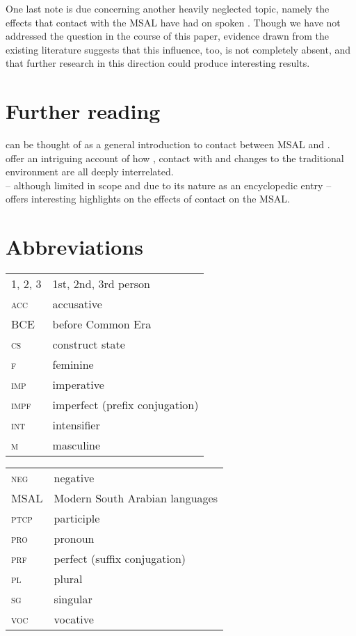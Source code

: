 \documentclass[output=paper]{langsci/langscibook}
\begin{document}
One last note is due concerning another heavily neglected topic, namely the effects that contact with the MSAL have had on spoken . Though we have not addressed the question in the course of this paper, evidence drawn from the existing literature \citep{Simeone-Senelle2002} suggests that this influence, too, is not completely absent, and that further research in this direction could produce interesting results. 

\section*{Further reading}

 \citet{Morris2017} can be thought of as a general introduction to contact between MSAL and . \\
 \citet{WatsonAl-Mahri2017} offer an intriguing account of how , contact with  and changes to the traditional environment are all deeply interrelated. \\ \citet{Lonnet2011} – although limited in scope and  due to its nature as an encyclopedic entry – offers interesting highlights on the effects of contact on the MSAL.

\section*{Abbreviations}

\begin{tabularx}{.45\textwidth}[t]{@{}lQ@{}}
\textsc{1, 2, 3} & 1st, 2nd, 3rd person \\
\textsc{acc} & accusative \\
BCE & before Common Era \\
\textsc{cs} & construct state \\
\textsc{f} & feminine \\
\textsc{imp} & imperative \\
\textsc{impf} & imperfect (prefix conjugation) \\
\textsc{int} & intensifier \\
\textsc{m} & masculine \\
\end{tabularx}%
\begin{tabularx}{.5\textwidth}[t]{@{}lQ@{}}
\textsc{neg} & negative \\
MSAL & {Modern South Arabian} languages \\
\textsc{ptcp} & {participle} \\
\textsc{pro} & pronoun \\
\textsc{prf} & perfect (suffix conjugation) \\
\textsc{pl} & plural \\
\textsc{sg} & singular \\
\textsc{voc} & {vocative} \\
\end{tabularx}%



\sloppy
\printbibliography[heading=subbibliography,notkeyword=this]
\end{document}
